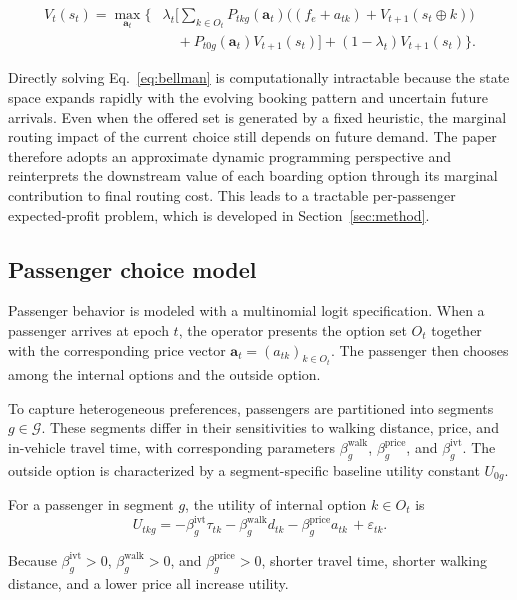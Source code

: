 \documentclass[preprint,12pt,authoryear]{elsarticle}
\begin{document}
\begin{align}
V_t(s_t)=\max_{\mathbf{a}_t}\Big\{&
\lambda_t \Big[\sum_{k\in O_t} P_{tkg}(\mathbf{a}_t)\big((f_e+a_{tk})+V_{t+1}(s_t\oplus k)\big) \nonumber\\
&\quad + P_{t0g}(\mathbf{a}_t) V_{t+1}(s_t)\Big]
+(1-\lambda_t)V_{t+1}(s_t)\Big\}.
\tag{7}\label{eq:bellman}
\end{align}

Directly solving Eq.~\eqref{eq:bellman} is computationally intractable because the state space expands rapidly with the evolving booking pattern and uncertain future arrivals. Even when the offered set is generated by a fixed heuristic, the marginal routing impact of the current choice still depends on future demand. The paper therefore adopts an approximate dynamic programming perspective and reinterprets the downstream value of each boarding option through its marginal contribution to final routing cost. This leads to a tractable per-passenger expected-profit problem, which is developed in Section~\ref{sec:method}.

\subsection{Passenger choice model}
\label{subsec:choice}

Passenger behavior is modeled with a multinomial logit specification. When a passenger arrives at epoch $t$, the operator presents the option set $O_t$ together with the corresponding price vector $\mathbf{a}_t=(a_{tk})_{k\in O_t}$. The passenger then chooses among the internal options and the outside option.

To capture heterogeneous preferences, passengers are partitioned into segments $g\in\mathcal{G}$. These segments differ in their sensitivities to walking distance, price, and in-vehicle travel time, with corresponding parameters $\beta_g^{\mathrm{walk}}$, $\beta_g^{\mathrm{price}}$, and $\beta_g^{\mathrm{ivt}}$. The outside option is characterized by a segment-specific baseline utility constant $U_{0g}$.

For a passenger in segment $g$, the utility of internal option $k\in O_t$ is
\begin{equation}
U_{tkg} = -\beta_g^{\mathrm{ivt}}\tau_{tk}
-\beta_g^{\mathrm{walk}}d_{tk}
-\beta_g^{\mathrm{price}}a_{tk}
\,+ \varepsilon_{tk}.
\tag{8}\label{eq:utility}
\end{equation}

Because $\beta_g^{\mathrm{ivt}} > 0$, $\beta_g^{\mathrm{walk}} > 0$, and $\beta_g^{\mathrm{price}} > 0$, shorter travel time, shorter walking distance, and a lower price all increase utility.
\end{document}
